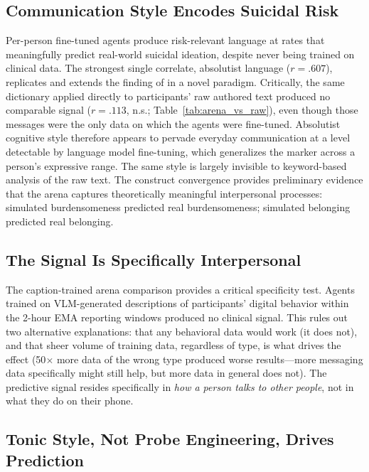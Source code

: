 \documentclass[review,12pt,authoryear]{elsarticle}
\begin{document}
\subsection{Communication Style Encodes Suicidal Risk}

Per-person fine-tuned agents produce risk-relevant language at rates that meaningfully predict real-world suicidal ideation, despite never being trained on clinical data. The strongest single correlate, absolutist language ($r = .607$), replicates and extends the finding of \citet{almosaiwi2018absolute} in a novel paradigm. Critically, the same dictionary applied directly to participants' raw authored text produced no comparable signal ($r = .113$, n.s.; Table~\ref{tab:arena_vs_raw}), even though those messages were the only data on which the agents were fine-tuned. Absolutist cognitive style therefore appears to pervade everyday communication at a level detectable by language model fine-tuning, which generalizes the marker across a person's expressive range. The same style is largely invisible to keyword-based analysis of the raw text. The construct convergence provides preliminary evidence that the arena captures theoretically meaningful interpersonal processes: simulated burdensomeness predicted real burdensomeness; simulated belonging predicted real belonging.

\subsection{The Signal Is Specifically Interpersonal}

The caption-trained arena comparison provides a critical specificity test. Agents trained on VLM-generated descriptions of participants' digital behavior within the 2-hour EMA reporting windows produced no clinical signal. This rules out two alternative explanations: that any behavioral data would work (it does not), and that sheer volume of training data, regardless of type, is what drives the effect (50$\times$ more data of the wrong type produced worse results---more messaging data specifically might still help, but more data in general does not). The predictive signal resides specifically in \textit{how a person talks to other people}, not in what they do on their phone.

\subsection{Tonic Style, Not Probe Engineering, Drives Prediction}
\end{document}
